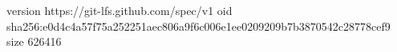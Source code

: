 version https://git-lfs.github.com/spec/v1
oid sha256:e0d4c4a57f75a252251aec806a9f6c006e1ee0209209b7b3870542c28778cef9
size 626416
